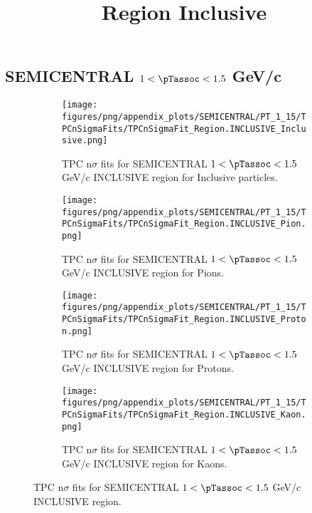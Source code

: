             \subsection*{SEMICENTRAL $1 < \pTassoc < 1.5$ GeV/c}
            \begin{figure}[H]
                \title{Region Inclusive}
                \begin{subfigure}[b]{0.5\textwidth}
                    \centering
                    \texttt{[image: figures/png/appendix\_plots/SEMICENTRAL/PT\_1\_15/TPCnSigmaFits/TPCnSigmaFit\_Region.INCLUSIVE\_Inclusive.png]}
                    \caption{TPC n$\sigma$ fits for SEMICENTRAL $1 < \pTassoc < 1.5$ GeV/c INCLUSIVE region for Inclusive particles.}
                    \label{fig:appendix_SEMICENTRAL_$1 < \pTassoc < 1.5$ GeV/c_INCLUSIVE_Inclusive}
                \end{subfigure}
                \begin{subfigure}[b]{0.5\textwidth}
                    \centering
                    \texttt{[image: figures/png/appendix\_plots/SEMICENTRAL/PT\_1\_15/TPCnSigmaFits/TPCnSigmaFit\_Region.INCLUSIVE\_Pion.png]}
                    \caption{TPC n$\sigma$ fits for SEMICENTRAL $1 < \pTassoc < 1.5$ GeV/c INCLUSIVE region for Pions.}
                    \label{fig:appendix_SEMICENTRAL_$1 < \pTassoc < 1.5$ GeV/c_INCLUSIVE_Pion}
                \end{subfigure}
                \begin{subfigure}[b]{0.5\textwidth}
                    \centering
                    \texttt{[image: figures/png/appendix\_plots/SEMICENTRAL/PT\_1\_15/TPCnSigmaFits/TPCnSigmaFit\_Region.INCLUSIVE\_Proton.png]}
                    \caption{TPC n$\sigma$ fits for SEMICENTRAL $1 < \pTassoc < 1.5$ GeV/c INCLUSIVE region for Protons.}
                    \label{fig:appendix_SEMICENTRAL_$1 < \pTassoc < 1.5$ GeV/c_INCLUSIVE_Proton}
                \end{subfigure}
                \begin{subfigure}[b]{0.5\textwidth}
                    \centering
                    \texttt{[image: figures/png/appendix\_plots/SEMICENTRAL/PT\_1\_15/TPCnSigmaFits/TPCnSigmaFit\_Region.INCLUSIVE\_Kaon.png]}
                    \caption{TPC n$\sigma$ fits for SEMICENTRAL $1 < \pTassoc < 1.5$ GeV/c INCLUSIVE region for Kaons.}
                    \label{fig:appendix_SEMICENTRAL_$1 < \pTassoc < 1.5$ GeV/c_INCLUSIVE_Kaon}
                \end{subfigure}
                \caption{TPC n$\sigma$ fits for SEMICENTRAL $1 < \pTassoc < 1.5$ GeV/c INCLUSIVE region.}
                \label{fig:appendix_SEMICENTRAL_$1 < \pTassoc < 1.5$ GeV/c_INCLUSIVE}
            \end{figure}
